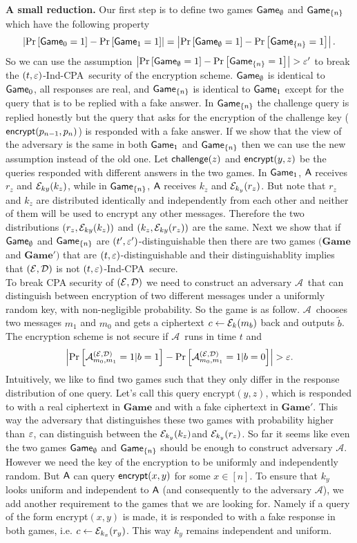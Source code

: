 \documentclass{article}
\newcommand{\tcpa}{$(t,\eps)$-Ind-CPA}
\def\A{{\sf A}}
\def\E{{\cal E}}
\def\D{{\cal D}}
\def\a {${\mathcal A}$}
\newcommand{\encrypt}{{\sf encrypt}}
\newcommand{\game}{{\sf Game}}
\newcommand{\dgame}{{\mathbf{Game}}}
\def\challenge{{\sf challenge}}
\begin{document}
\noindent \textbf{A small reduction.} Our first step is to define two games $\game_{\emptyset}$ and $\game_{\{n\}}$ which have the following property 
\[\abs{\prob{\game_0=1}-\prob{\game_1=1}}=\abs{\prob{\game_{\emptyset}=1}-\prob{\game_{\{n\}}=1}}. \]
\noindent So we can use the assumption $\abs{\prob{\game_{\emptyset}=1}-\prob{\game_{\{n\}}=1}} > \eps'$ to break the \tcpa~security of the encryption scheme. $\game_{\emptyset}$ is identical to $\game_0$, all responses are real, and $\game_{\{n\}}$ is identical to $\game_1$ except for the query that is to be replied with a fake answer. In $\game_{\{n\}}$ the challenge query is replied honestly but the query that asks for the encryption of the challenge key ($\encrypt(p_{n-1},p_{n})$) is responded with a fake answer. If we show that the view of the adversary is the same in both $\game_1$ and $\game_{\{n\}}$ then we can use the new assumption instead of the old one. Let $\challenge(z)$ and $\encrypt(y,z)$ be the queries responded with different answers in the two games.  In $\game_{1}$, $\A$ receives $r_z$ and $\E_{k{y}}(k_z)$, while in $\game_{\cub{n}}$, $\A$ receives $k_z$ and $\E_{k_y}(r_z)$. But note that $r_z$ and $k_z$ are distributed identically and independently from each other and neither of them will be used to encrypt any other messages. Therefore the two distributions $(r_z,\E_{k{y}}(k_z))$ and $(k_z,\E_{k{y}}(r_z))$ are the same. Next we show that if $\game_{\emptyset}$ and $\game_{\cub{n}}$ are $(t',\varepsilon')$-distinguishable then there are two games $(\dgame$ and $\dgame')$ that are $(t,\varepsilon)$-distinguishable and their distinguishablity implies that $(\E,\D)$ is not \tcpa~secure.\\ 

To break CPA security of $(\E,\D)$ we need to construct an adversary \a~that can distinguish between encryption of two different messages under a uniformly random key, with non-negligible probability. So the game is as follow. \a~chooses two messages $m_1$ and $m_0$ and gets a ciphertext $c\leftarrow \E_k(m_b)$ back and outputs $\tilde{b}$. The encryption scheme is not secure if \a~runs in time $t$ and
\[\abs{\prob{{\mathcal A}_{m_0,m_1}^{(\E,\D)}=1|b=1}-\prob{{\mathcal A}_{m_0,m_1}^{(\E,\D)}=1|b=0}}>\eps.\]
Intuitively, we like to find two games such that they only differ in the response distribution of one query. Let's  call this query \encrypt$(y,z)$, which is responded to with a real ciphertext in $\dgame$ and with a fake ciphertext in $\dgame'$. This way the adversary that distinguishes these two games with probability higher than $\varepsilon$, can distinguish between the $\E_{k_y}(k_z)$and $\E_{k_y}(r_z)$. So far it seems like even the two games $\game_{\emptyset}$ and $\game_{\cub{n}}$ should be enough to construct adversary \a. However we need the key of the encryption to be uniformly and independently random. But $\A$ can query $\encrypt(x,y)$ for some $x \in [n]$. To ensure that $k_y$ looks uniform and independent to $\A$ (and consequently to the adversary \a), we add another requirement to the games that we are looking for. Namely if a query of the form \encrypt$(x,y)$ is made, it is responded to with a fake response in both games, i.e. $c \leftarrow \E_{k_x}(r_y)$. This way $k_y$ remains independent and uniform. \\
\end{document}
